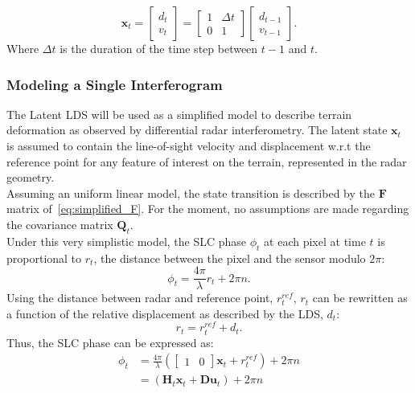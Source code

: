 \documentclass{article}
\begin{document}
\begin{equation}\label{eq:simplified_F}
	\mathbf{x}_t = 
		\begin{bmatrix}
			d_{t}\\
			v_{t}
		\end{bmatrix} =
		\begin{bmatrix}
		1 & \Delta t\\
		0 & 1
		\end{bmatrix}
		\begin{bmatrix}
			d_{t-1}\\
			v_{t-1}
		\end{bmatrix}.
\end{equation}
Where $\Delta t$ is the duration of the time step between $t-1$ and $t$.\\
\subsubsection{Modeling a Single Interferogram}
The Latent LDS will be used as a simplified model to describe terrain deformation as observed by differential radar interferometry. The latent state $\mathbf{x}_t$ is assumed to contain the line-of-sight velocity and displacement w.r.t  the reference point for any feature of interest on the terrain, represented in the radar geometry.\\ Assuming an uniform linear model, the state transition is described by the $\mathbf{F}$ matrix of~\autoref{eq:simplified_F}. For the moment, no assumptions are made regarding the covariance matrix $\mathbf{Q}_t$.\\
Under this very simplistic model, the SLC phase $\phi_t$ at each pixel at time $t$ is proportional to $r_t$, the distance between the pixel and the sensor modulo $2 \pi$:
\begin{equation}
	\phi_t = \frac{4\pi}{\lambda} r_t + 2 \pi n.
\end{equation}
Using the distance between radar and reference point, $r_t^{ref}$, $r_t$ can be rewritten as a function of the relative displacement as described by the LDS, $d_t$:
\begin{equation}
	r_t = r_t^{ref} + d_t.
\end{equation}
Thus, the SLC phase can be expressed as:
\begin{equation}
	\begin{aligned}
	\phi_t  &= \frac{4\pi}{\lambda} \left(
		\begin{bmatrix}
			1 & 0
		\end{bmatrix} \mathbf{x}_{t}
		+  r_t^{ref}
		\right) + 2 \pi n\\
		 &= \left(\mathbf{H}_{t}\mathbf{x}_t + \mathbf{D}\mathbf{u}_t\right) + 2 \pi n
	\end{aligned}		
\end{equation}
\end{document}

